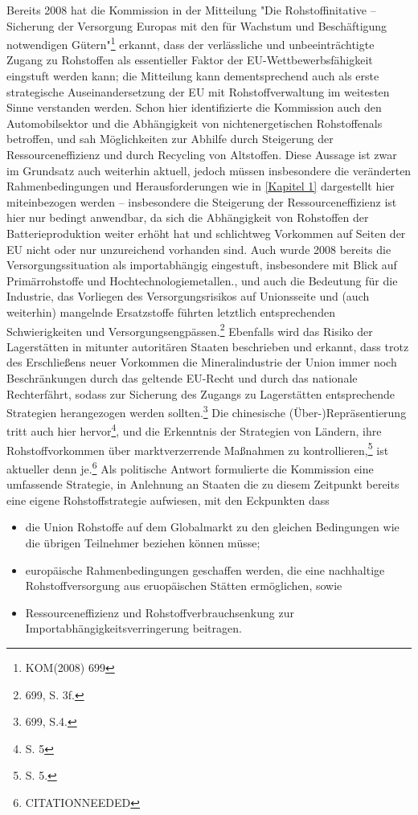 \documentclass[12pt,a4paper,oneside]{book} %
\begin{document}
Bereits 2008 hat die Kommission in der Mitteilung "Die Rohstoffinitative -- Sicherung der Versorgung Europas mit den für Wachstum und Beschäftigung notwendigen Gütern"\footnote{KOM(2008) 699} erkannt, dass der verlässliche und unbeeinträchtigte Zugang zu Rohstoffen als essentieller Faktor der EU-Wettbewerbsfähigkeit eingstuft werden kann; die Mitteilung kann dementsprechend auch als erste strategische Auseinandersetzung der EU mit Rohstoffverwaltung im weitesten Sinne verstanden werden. Schon hier identifizierte die Kommission auch den Automobilsektor und die Abhängigkeit von \glqq nichtenergetischen Rohstoffen\grqq als betroffen, und sah Möglichkeiten zur Abhilfe \glqq durch Steigerung der Ressourceneffizienz und durch Recycling von Altstoffen\grqq. Diese Aussage ist zwar im Grundsatz auch weiterhin aktuell, jedoch müssen insbesondere die veränderten Rahmenbedingungen und Herausforderungen wie in \ref{Kapitel 1} dargestellt hier miteinbezogen werden -- insbesondere die Steigerung der Ressourceneffizienz ist hier nur bedingt anwendbar, da sich die Abhängigkeit von Rohstoffen der Batterieproduktion weiter erhöht hat und schlichtweg Vorkommen auf Seiten der EU nicht oder nur unzureichend vorhanden sind. Auch wurde 2008 bereits die Versorgungssituation als importabhängig eingestuft, insbesondere mit Blick auf Primärrohstoffe und \glqq Hochtechnologiemetallen\grqq., und auch die Bedeutung für die Industrie, das Vorliegen des Versorgungsrisikos auf Unionsseite und (auch weiterhin) mangelnde Ersatzstoffe führten letztlich entsprechenden Schwierigkeiten und Versorgungsengpässen.\footnote{699, S. 3f.} Ebenfalls wird das Risiko der Lagerstätten in mitunter autoritären Staaten beschrieben und erkannt, dass trotz des Erschließens neuer Vorkommen die Mineralindustrie der Union \glqq immer noch Beschränkungen durch das geltende EU-Recht und durch das nationale Recht\grqq erfährt, sodass zur Sicherung des Zugangs zu Lagerstätten entsprechende Strategien herangezogen werden sollten.\footnote{699, S.4.} Die chinesische (Über-)Repräsentierung tritt auch hier hervor\footnote{S. 5}, und die Erkenntnis der Strategien von Ländern, ihre Rohstoffvorkommen über marktverzerrende Maßnahmen zu kontrollieren,\footnote{S. 5.} ist aktueller denn je.\footnote{CITATIONNEEDED}
Als politische Antwort formulierte die Kommission eine \glqq umfassende Strategie\grqq, in Anlehnung an Staaten die zu diesem Zeitpunkt bereits eine eigene Rohstoffstrategie aufwiesen, mit den Eckpunkten dass
\begin{itemize}
	\item die Union Rohstoffe auf dem Globalmarkt zu den gleichen Bedingungen wie die übrigen Teilnehmer beziehen können müsse;
	\item europäische Rahmenbedingungen geschaffen werden, die eine nachhaltige Rohstoffversorgung aus eruopäischen Stätten ermöglichen, sowie
	\item Ressourceneffizienz und Rohstoffverbrauchsenkung zur Importabhängigkeitsverringerung 
	beitragen.
\end{itemize}
\end{document}
